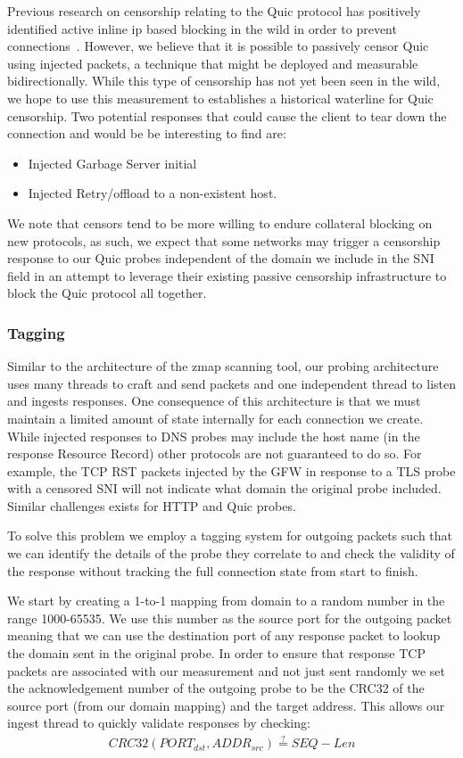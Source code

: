 Previous research on censorship relating to the Quic protocol has positively
identified active inline ip based blocking in the wild in order to prevent
connections~\cite{}. However, we believe that it is possible to passively censor
Quic using injected packets, a technique that might be deployed and measurable
bidirectionally. While this type of censorship has not yet been seen in the
wild, we hope to use this measurement to establishes a historical waterline for
Quic censorship. Two potential responses that could cause the client to tear
down the connection and would be be interesting to find are:
\begin{itemize}
	\item Injected Garbage Server initial
	\item Injected Retry/offload to a non-existent host.
\end{itemize}


We note that censors tend to be more willing to endure collateral blocking on
new protocols, as such, we expect that some networks may trigger a censorship
response to our Quic probes independent of the domain we include in the SNI
field in an attempt to leverage their existing passive censorship infrastructure
to block the Quic protocol all together.

\subsubsection{Tagging}

Similar to the architecture of the zmap scanning tool, our probing architecture
uses many threads to craft and send packets and one independent thread to listen
and ingests responses. One consequence of this architecture is that we must
maintain a limited amount of state internally for each connection we create.
While injected responses to DNS probes may include the host name (in the
response Resource Record) other protocols are not guaranteed to do so. For
example, the TCP RST packets injected by the GFW in response to a TLS probe with
a censored SNI will not indicate what domain the original probe included.
Similar challenges exists for HTTP and Quic probes.

To solve this problem we employ a tagging system for outgoing packets such that
we can identify the details of the probe they correlate to and check the
validity of the response without tracking the full connection state from start
to finish.

We start by creating a 1-to-1 mapping from domain to a random number in the
range 1000-65535. We use this number as the source port for the outgoing packet
meaning that we can use the destination port of any response packet to lookup
the domain sent in the original probe. In order to ensure that response TCP
packets are associated with our measurement and not just sent randomly we set
the acknowledgement number of the outgoing probe to be the CRC32 of the source
port (from our domain mapping) and the target address. This allows our ingest
thread to quickly validate responses by checking:
\begin{gather*}
CRC32(PORT_{dst},ADDR_{src}) \stackrel{?}{=} SEQ - Len
\end{gather*}

